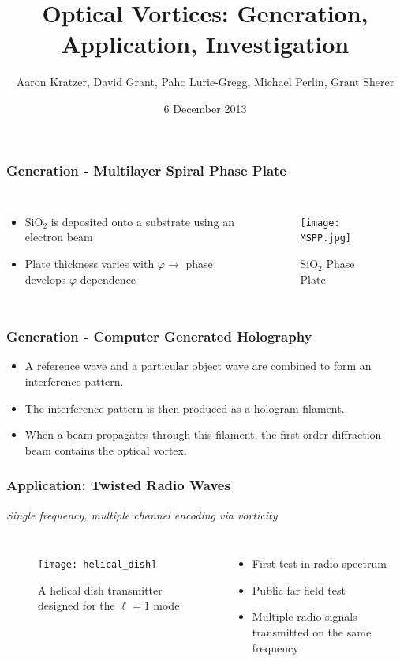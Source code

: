 \documentclass[xcolor=dvipsnames]{beamer}
\title{Optical Vortices: Generation, Application, Investigation}
\author{Aaron Kratzer, David Grant, Paho Lurie-Gregg,
  Michael Perlin, Grant Sherer}
\date{6 December 2013}
\newenvironment{items}[1][]
{\begin{itemize}
    \ifthenelse{\isempty{#1}}
    {\setlength{\itemsep}{12pt}}{\setlength{\itemsep}{#1}}}
  {\end{itemize}}
\renewcommand{\phi}{\varphi} %
\begin{document}
\begin{frame}
  \maketitle
\end{frame}

\begin{frame}
	\frametitle{Generation - Multilayer Spiral Phase Plate}
  \begin{columns}[c]
    \begin{items}
    \item SiO$_2$ is deposited onto a substrate using an electron beam
    \item Plate thickness varies with $\phi\to$ phase
      develops $\phi$ dependence
    \end{items}
    \begin{figure}
      \texttt{[image: MSPP.jpg]}
      \caption{SiO$_2$ Phase Plate}
      \label{MSPP}
    \end{figure}
  \end{columns}
\end{frame}

\begin{frame}
	\frametitle{Generation - Computer Generated Holography}
  \begin{items}
  \item A reference wave and a particular object wave are combined to
    form an interference pattern.
  \item The interference pattern is then produced as a hologram
    filament.
  \item When a beam propagates through this filament, the first order
    diffraction beam contains the optical vortex.
  \end{items}
\end{frame}

\begin{frame}
	\frametitle{Application: Twisted Radio Waves}
	\begin{center}
		\emph{Single frequency, multiple channel encoding via vorticity}
	\end{center}
  \begin{columns}[c]
    \begin{figure}
      \texttt{[image: helical\_dish]}
      \caption{A helical dish transmitter designed for the $\ell=1$
        mode}
      \label{pic:dish}
    \end{figure}
		\begin{items}
		\item First test in radio spectrum
		\item Public far field test
		\item Multiple radio signals transmitted on the same frequency
		\end{items}
	\end{columns}
\end{frame}
\end{document}
